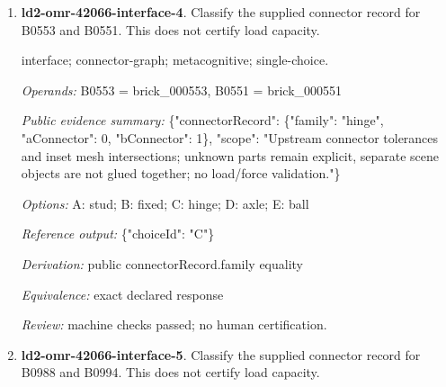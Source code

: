 \begin{enumerate}
\par{\small interface; connector-graph; metacognitive; single-choice.\par\textit{Operands:} B0413 = brick\_000413, B0414 = brick\_000414\par\textit{Public evidence summary:} \{"connectorRecord": \{"family": "fixed", "aConnector": 1, "bConnector": 1\}, "scope": "Upstream connector tolerances and inset mesh intersections; unknown parts remain explicit, separate scene objects are not glued together; no load/force validation."\}\par\textit{Options:} A: axle; B: hinge; C: fixed; D: ball; E: stud\par\textit{Reference output:} \{"choiceId": "C"\}\par\textit{Derivation:} public connectorRecord.family equality\par\textit{Equivalence:} exact declared response\par\textit{Review:} machine checks passed; no human certification.}
\item \textbf{ld2-omr-42066-interface-4}. Classify the supplied connector record for B0553 and B0551. This does not certify load capacity.
\par{\small interface; connector-graph; metacognitive; single-choice.\par\textit{Operands:} B0553 = brick\_000553, B0551 = brick\_000551\par\textit{Public evidence summary:} \{"connectorRecord": \{"family": "hinge", "aConnector": 0, "bConnector": 1\}, "scope": "Upstream connector tolerances and inset mesh intersections; unknown parts remain explicit, separate scene objects are not glued together; no load/force validation."\}\par\textit{Options:} A: stud; B: fixed; C: hinge; D: axle; E: ball\par\textit{Reference output:} \{"choiceId": "C"\}\par\textit{Derivation:} public connectorRecord.family equality\par\textit{Equivalence:} exact declared response\par\textit{Review:} machine checks passed; no human certification.}
\item \textbf{ld2-omr-42066-interface-5}. Classify the supplied connector record for B0988 and B0994. This does not certify load capacity.

\end{enumerate}
